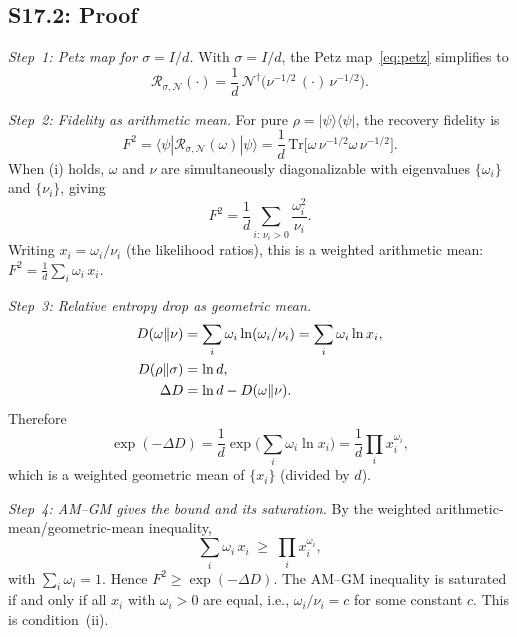 \documentclass[prl,twocolumn,superscriptaddress,longbibliography]{revtex4-2}
\newcommand{\Tr}{\mathrm{Tr}}
\newcommand{\Petz}{\mathcal{R}}
\newcommand{\chan}{\mathcal{N}}
\newcommand{\ket}[1]{|#1\rangle}
\newcommand{\bra}[1]{\langle#1|}
\begin{document}
\subsection{S17.2: Proof}

\emph{Step~1: Petz map for $\sigma = I/d$.}
With $\sigma = I/d$, the Petz map~\eqref{eq:petz} simplifies to
\begin{equation}
\Petz_{\sigma,\chan}(\cdot) = \frac{1}{d}\,
\chan^\dagger\!\big(\nu^{-1/2}\,(\cdot)\,\nu^{-1/2}\big).
\end{equation}

\emph{Step~2: Fidelity as arithmetic mean.}
For pure $\rho = \ket{\psi}\!\bra{\psi}$, the recovery fidelity is
\begin{equation}
F^2 = \bra{\psi}\Petz_{\sigma,\chan}(\omega)\ket{\psi}
= \frac{1}{d}\,\Tr\!\big[\omega\,\nu^{-1/2}\omega\,\nu^{-1/2}\big].
\end{equation}
When (i) holds, $\omega$ and $\nu$ are simultaneously
diagonalizable with eigenvalues $\{\omega_i\}$ and $\{\nu_i\}$,
giving
\begin{equation}
F^2 = \frac{1}{d}\sum_{i:\,\nu_i > 0}
\frac{\omega_i^2}{\nu_i}.
\label{eq:F2_arith}
\end{equation}
Writing $x_i = \omega_i/\nu_i$ (the likelihood ratios), this is
a weighted arithmetic mean:
$F^2 = \frac{1}{d}\sum_i \omega_i\, x_i$.

\emph{Step~3: Relative entropy drop as geometric mean.}
\begin{align}
D(\omega\|\nu) &= \sum_i \omega_i \ln(\omega_i/\nu_i)
= \sum_i \omega_i \ln x_i, \notag\\
D(\rho\|\sigma) &= \ln d, \notag\\
\Delta D &= \ln d - D(\omega\|\nu).
\end{align}
Therefore
\begin{equation}
\exp(-\Delta D) = \frac{1}{d}\exp\!\bigg(\sum_i \omega_i
\ln x_i\bigg)
= \frac{1}{d}\prod_i x_i^{\omega_i},
\label{eq:expDD_geom}
\end{equation}
which is a weighted geometric mean of $\{x_i\}$ (divided by $d$).

\emph{Step~4: AM--GM gives the bound and its saturation.}
By the weighted arithmetic-mean/geometric-mean inequality,
\begin{equation}
\sum_i \omega_i\, x_i \;\geq\;
\prod_i x_i^{\omega_i},
\end{equation}
with $\sum_i \omega_i = 1$.
Hence $F^2 \geq \exp(-\Delta D)$.  The AM--GM inequality is
saturated if and only if all $x_i$ with $\omega_i > 0$ are equal,
i.e., $\omega_i/\nu_i = c$ for some constant $c$.
This is condition~(ii).
\end{document}
